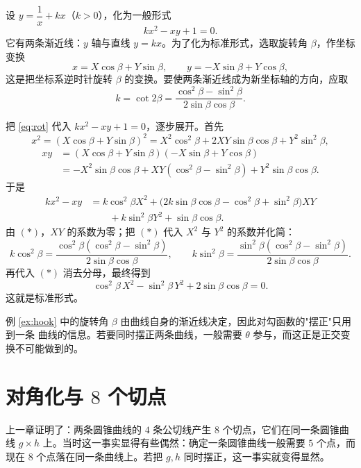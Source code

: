 \begin{example}[对勾函数]
\label{ex:hook}
设 $y=\dfrac1x+kx$（$k>0$），化为一般形式
\[
kx^2-xy+1=0 .
\]
它有两条渐近线：$y$ 轴与直线 $y=kx$。为了化为标准形式，选取旋转角 $\beta$，作坐标变换
\begin{equation}
\label{eq:rot}
x=X\cos\beta+Y\sin\beta,\qquad y=-X\sin\beta+Y\cos\beta ,
\end{equation}
这是把坐标系逆时针旋转 $\beta$ 的变换。要使两条渐近线成为新坐标轴的方向，应取
\[
k=\cot 2\beta=\frac{\cos^2\beta-\sin^2\beta}{2\sin\beta\cos\beta}. \tag{$\ast$}
\]

把 \eqref{eq:rot} 代入 $kx^2-xy+1=0$，逐步展开。首先
\[
x^2=(X\cos\beta+Y\sin\beta)^2=X^2\cos^2\beta+2XY\sin\beta\cos\beta+Y^2\sin^2\beta,
\]
\begin{align*}
xy&=(X\cos\beta+Y\sin\beta)(-X\sin\beta+Y\cos\beta)\\
&=-X^2\sin\beta\cos\beta+XY(\cos^2\beta-\sin^2\beta)+Y^2\sin\beta\cos\beta .
\end{align*}
于是
\begin{align*}
kx^2-xy
&=k\cos^2\beta X^2+\big(2k\sin\beta\cos\beta-\cos^2\beta+\sin^2\beta\big)XY\\
&\qquad+k\sin^2\beta Y^2+\sin\beta\cos\beta .
\end{align*}
由 $(\ast)$，$XY$ 的系数为零；把 $(\ast)$ 代入 $X^2$ 与 $Y^2$ 的系数并化简：
\[
k\cos^2\beta=\frac{\cos^2\beta(\cos^2\beta-\sin^2\beta)}{2\sin\beta\cos\beta},
\qquad
k\sin^2\beta=\frac{\sin^2\beta(\cos^2\beta-\sin^2\beta)}{2\sin\beta\cos\beta}.
\]
再代入 $(\ast)$ 消去分母，最终得到
\[
\cos^2\beta\,X^2-\sin^2\beta\,Y^2+2\sin\beta\cos\beta=0 .
\]
这就是标准形式。
\end{example}

\begin{remark}
例 \ref{ex:hook} 中的旋转角 $\beta$ 由曲线自身的渐近线决定，因此对勾函数的"摆正"只用到一条
曲线的信息。若要同时摆正两条曲线，一般需要 $\theta$ 参与，而这正是正交变换不可能做到的。
\end{remark}

\section{对角化与 $8$ 个切点}

上一章证明了：两条圆锥曲线的 $4$ 条公切线产生 $8$ 个切点，它们在同一条圆锥曲线
$g\times h$ 上。当时这一事实显得有些偶然：确定一条圆锥曲线一般需要 $5$ 个点，而现在 $8$
个点落在同一条曲线上。若把 $g,h$ 同时摆正，这一事实就变得显然。


